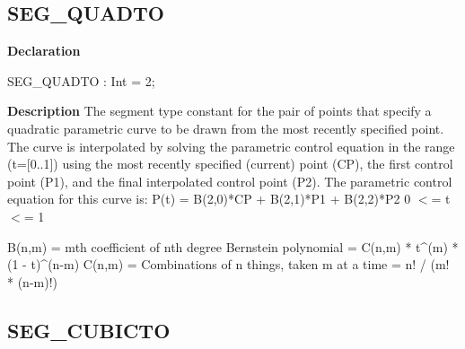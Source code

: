 \documentclass{report}
\newif\ifpdf
\begin{document}
\subsection*{SEG{\_}QUADTO}
\fi
\label{NewPascal.GUI.Geom-SEG_QUADTO}
\begin{list}{}{
\setlength{\itemindent}{0cm}
\setlength{\listparindent}{0cm}
\setlength{\leftmargin}{\evensidemargin}
\addtolength{\leftmargin}{\tmplength}
\settowidth{\labelsep}{X}
\addtolength{\leftmargin}{\labelsep}
\setlength{\labelwidth}{\tmplength}
}
\item[\textbf{Declaration}\hfill]
\ifpdf
\begin{flushleft}
\fi
\begin{ttfamily}
SEG{\_}QUADTO     : Int = 2;\end{ttfamily}

\ifpdf
\end{flushleft}
\fi

\par
\item[\textbf{Description}]
The segment type constant for the pair of points that specify a quadratic parametric curve to be drawn from the most recently specified point. The curve is interpolated by solving the parametric control equation in the range (t=[0..1]) using the most recently specified (current) point (CP), the first control point (P1), and the final interpolated control point (P2). The parametric control equation for this curve is: P(t) = B(2,0)*CP + B(2,1)*P1 + B(2,2)*P2 0 {$<$}= t {$<$}= 1

B(n,m) = mth coefficient of nth degree Bernstein polynomial = C(n,m) * t{\^{}}(m) * (1 {-} t){\^{}}(n{-}m) C(n,m) = Combinations of n things, taken m at a time = n! / (m! * (n{-}m)!)

\end{list}
\ifpdf
\subsection*{\large{\textbf{SEG{\_}CUBICTO}}\normalsize\hspace{1ex}\hrulefill}
\else
\end{document}

